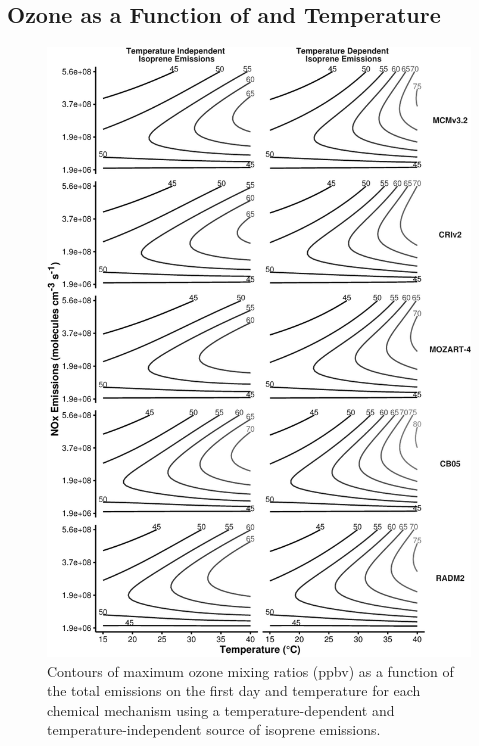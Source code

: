 \subsection[Ozone as a Function of NOx and Temperature]{Ozone as a Function of  and Temperature} \label{ss:r_contours} 
\begin{figure}%
    \centering%
    \caption{Contours of maximum ozone mixing ratios (ppbv) as a function of the total  emissions on the first day and temperature for each chemical mechanism using a temperature-dependent and temperature-independent source of isoprene emissions.}
    \label{f:ozone_contours}%
    \includegraphics[width=\textwidth]{img/O3_comparison}%
\end{figure}

